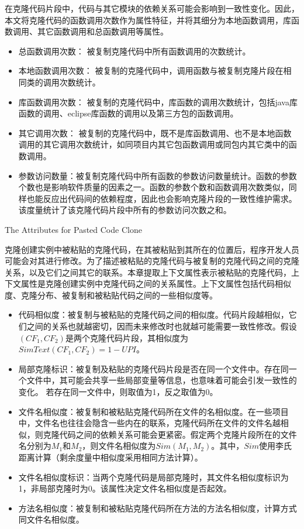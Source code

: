 在克隆代码片段中，代码与其它模块的依赖关系可能会影响到一致性变化。因此，本文将克隆代码的函数调用次数作为属性特征，并将其细分为本地函数调用，库函数调用、其它函数调用和总函数调用等属性。

\begin{itemize}
\item  
总函数调用次数：
被复制克隆代码中所有函数调用的次数统计。
\item  
本地函数调用次数：
被复制的克隆代码中，调用函数与被复制克隆片段在相同类的调用次数统计。
\item  
库函数调用次数：
被复制的克隆代码中，库函数的调用次数统计，包括java库函数的调用、eclipse库函数的调用以及第三方包的函数调用。
\item  
其它调用次数：
被复制的克隆代码中，既不是库函数调用、也不是本地函数调用的其它调用次数统计，如同项目内其它包函数调用或同包内其它类中的函数调用。
\item  
参数访问数量：被复制克隆代码中所有函数的参数访问数量统计。函数的参数个数也是影响软件质量的因素之一。函数的参数个数和函数调用次数类似，同样也能反应出代码间的依赖程度，因此也会影响克隆片段的一致性维护需求。该度量统计了该克隆代码片段中所有的参数访问次数之和。
\end{itemize}

{The Attributes for Pasted Code Clone}

克隆创建实例中被粘贴的克隆代码，在其被粘贴到其所在的位置后，程序开发人员可能会对其进行修改。为了描述被粘贴的克隆代码与被复制的克隆代码之间的克隆关系，以及它们之间其它的联系。本章提取上下文属性表示被粘贴的克隆代码，上下文属性是克隆创建实例中克隆代码之间的关系属性。上下文属性包括代码相似度、克隆分布、被复制和被粘贴代码之间的一些相似度等。

\begin{itemize}
\item
代码相似度：被复制与被粘贴的克隆代码之间的相似度。代码片段越相似，它们之间的关系也就越密切，因而未来修改时也就越可能需要一致性修改。假设$(CF_1,CF_2) $是两个克隆代码片段，其相似度为$\mathit{SimText} (CF_1,CF_2) = 1-\mathit{UPI}$。
\item
局部克隆标识：被复制及粘贴的克隆代码片段是否在同一个文件中。存在同一个文件中，其可能会共享一些局部变量等信息，也意味着可能会引发一致性的变化。 若存在同一文件中，则取值为1，反之取值为0。
\item
文件名相似度：被复制和被粘贴克隆代码所在文件的名相似度。在一些项目中，文件名也往往会隐含一些内在的联系，克隆代码所在文件的文件名越相似，则克隆代码之间的依赖关系可能会更紧密。假定两个克隆片段所在的文件名分别为$M_1$和$M_2$，则文件名相似度为$\mathit{Sim}(M_1,M_2)$。其中，$\mathit{Sim}$使用李氏距离\cite{levenshtein1966binary,navarro2001guided}计算（剩余度量中相似度采用相同方法计算）。
\item
文件名相似度标识：当两个克隆代码是局部克隆时，其文件名相似度标识为1，非局部克隆时为0。该属性决定文件名相似度是否起效。
\item
方法名相似度：被复制和被粘贴克隆代码所在方法的方法名相似度，计算方式同文件名相似度。
\end{itemize}


